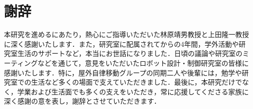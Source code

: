 \chapter*{謝辞}

本研究を進めるにあたり，熱心にご指導いただいた林原靖男教授と上田隆一教授に深く感謝いたします．また，研究室に配属されてからの4年間，学外活動や研究室生活のサポートなど，本当にお世話になりました．日頃の議論や研究室のミーティングなどを通じて，意見をいただいたロボット設計・制御研究室の皆様に感謝いたします．特に，屋外自律移動グループの同期二人や後輩には，勉学や研究室での生活など多くの場面で支えていただきました．最後に，本研究だけでなく，学業および生活面でも多くの支えをいただき，常に応援してくださる家族に深く感謝の意を表し，謝辞とさせていただきます．
%
